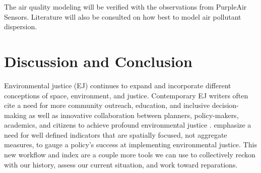 \documentclass[article,12pt]{article}
\numberwithin{equation}{section}
\begin{document}
The air quality modeling will be verified with the observations from PurpleAir Sensors. Literature will also be consulted on how best to model air pollutant dispersion.

\section*{Discussion and Conclusion}

	Environmental justice (EJ) continues to expand and incorporate different conceptions of space, environment, and justice. Contemporary EJ writers often cite a need for more community outreach, education, and inclusive decision-making as well as innovative collaboration between planners, policy-makers, academics, and citizens to achieve profound environmental justice \cite{walker2010, corburn2003, pearsall2010}. \textcite{pearsall2010} emphasize a need for well defined indicators that are spatially focused, not aggregate measures, to gauge a policy's success at implementing environmental justice. This new workflow and index are a couple more tools we can use to collectively reckon with our history, assess our current situation, and work toward reparations. 

\begingroup           %
\setlength\bibitemsep{12pt}  %
\printbibliography
\endgroup
\end{document}
